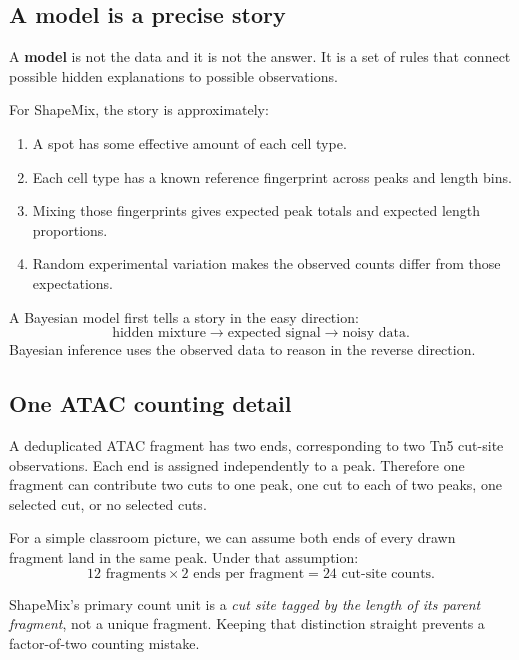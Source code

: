 \documentclass[11pt]{article}
\newcommand{\term}[1]{\textbf{\color{tealdark}#1}}
\begin{document}
\subsection{A model is a precise story}

A \term{model} is not the data and it is not the answer. It is a set of rules that
connect possible hidden explanations to possible observations.

For ShapeMix, the story is approximately:

\begin{enumerate}[leftmargin=2em]
  \item A spot has some effective amount of each cell type.
  \item Each cell type has a known reference fingerprint across peaks and length bins.
  \item Mixing those fingerprints gives expected peak totals and expected length proportions.
  \item Random experimental variation makes the observed counts differ from those expectations.
\end{enumerate}

\begin{bigidea}
A Bayesian model first tells a story in the easy direction:
\[
\text{hidden mixture}\longrightarrow\text{expected signal}\longrightarrow\text{noisy data}.
\]
Bayesian inference uses the observed data to reason in the reverse direction.
\end{bigidea}

\subsection{One ATAC counting detail}

A deduplicated ATAC fragment has two ends, corresponding to two Tn5 cut-site
observations. Each end is assigned independently to a peak. Therefore one fragment
can contribute two cuts to one peak, one cut to each of two peaks, one selected
cut, or no selected cuts.

For a simple classroom picture, we can assume both ends of every drawn fragment
land in the same peak. Under that assumption:
\[
12\text{ fragments}\times2\text{ ends per fragment}=24\text{ cut-site counts}.
\]

\begin{watchout}
ShapeMix's primary count unit is a \emph{cut site tagged by the length of its parent
fragment}, not a unique fragment. Keeping that distinction straight prevents a
factor-of-two counting mistake.
\end{watchout}
\end{document}
